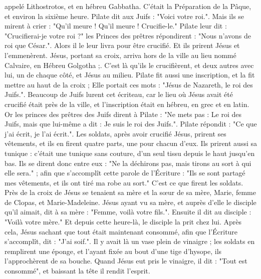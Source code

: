 appelé Lithostrotos, et en hébreu Gabbatha. C’était la Préparation de la Pâque, et environ la sixième heure. Pilate dit aux Juifs : "Voici votre roi.". Mais ils se mirent à crier : "Qu’il meure ! Qu’il meure ! Crucifie-le." Pilate leur dit : "Crucifierai-je votre roi ?" les Princes des prêtres répondirent : "Nous n’avons de roi que César.". Alors il le leur livra pour être crucifié. Et ils prirent Jésus et l’emmenèrent. Jésus, portant sa croix, arriva hors de la ville au lieu nommé Calvaire, en Hébreu Golgotha ;. C’est là qu’ils le crucifièrent, et deux autres avec lui, un de chaque côté, et Jésus au milieu. Pilate fit aussi une inscription, et la fit mettre au haut de la croix ; Elle portait ces mots : "Jésus de Nazareth, le roi des Juifs.". Beaucoup de Juifs lurent cet écriteau, car le lieu où Jésus avait été crucifié était près de la ville, et l’inscription était en hébreu, en grec et en latin. Or les princes des prêtres des Juifs dirent à Pilate : "Ne mets pas : Le roi des Juifs, mais que lui-même a dit : Je suis le roi des Juifs.". Pilate répondit : "Ce que j’ai écrit, je l’ai écrit.". Les soldats, après avoir crucifié Jésus, prirent ses vêtements, et ils en firent quatre parts, une pour chacun d’eux. Ils prirent aussi sa tunique : c’était une tunique sans couture, d’un seul tissu depuis le haut jusqu’en bas. Ils se dirent donc entre eux : "Ne la déchirons pas, mais tirons au sort à qui elle sera." ; afin que s’accomplît cette parole de l’Écriture : "Ils se sont partagé mes vêtements, et ils ont tiré ma robe au sort." C’est ce que firent les soldats. Près de la croix de Jésus se tenaient sa mère et la sœur de sa mère, Marie, femme de Clopas, et Marie-Madeleine. Jésus ayant vu sa mère, et auprès d’elle le disciple qu’il aimait, dit à sa mère : "Femme, voilà votre fils.". Ensuite il dit au disciple : "Voilà votre mère." Et depuis cette heure-là, le disciple la prit chez lui. Après cela, Jésus sachant que tout était maintenant consommé, afin que l’Écriture s’accomplît, dit : "J’ai soif.". Il y avait là un vase plein de vinaigre ; les soldats en remplirent une éponge, et l’ayant fixée au bout d’une tige d’hysope, ils l’approchèrent de sa bouche. Quand Jésus eut pris le vinaigre, il dit : "Tout est consommé", et baissant la tête il rendit l’esprit.
